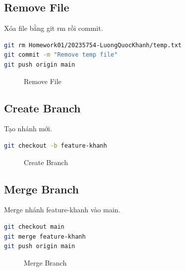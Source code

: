 \documentclass[12pt,a4paper]{article}
\begin{document}
\subsection{Remove File}
Xóa file bằng git rm rồi commit.

\begin{lstlisting}[language=bash]
git rm Homework01/20235754-LuongQuocKhanh/temp.txt
git commit -m "Remove temp file"
git push origin main
\end{lstlisting}

\begin{figure}[H]
    \centering
    \caption{Remove File}
\end{figure}

\subsection{Create Branch}
Tạo nhánh mới.

\begin{lstlisting}[language=bash]
git checkout -b feature-khanh
\end{lstlisting}

\begin{figure}[H]
    \centering
    \caption{Create Branch}
\end{figure}

\subsection{Merge Branch}
Merge nhánh feature-khanh vào main.

\begin{lstlisting}[language=bash]
git checkout main
git merge feature-khanh
git push origin main
\end{lstlisting}

\begin{figure}[H]
    \centering
    \caption{Merge Branch}
\end{figure}
\end{document}
